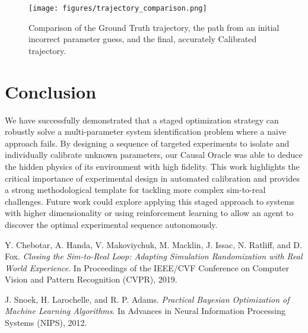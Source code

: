 \documentclass{article}
\begin{document}
\begin{figure}[h!]
\centering
\texttt{[image: figures/trajectory\_comparison.png]}
\caption{Comparison of the Ground Truth trajectory, the path from an initial incorrect parameter guess, and the final, accurately Calibrated trajectory.}
\label{fig:trajectory}
\end{figure}

\section{Conclusion}
We have successfully demonstrated that a staged optimization strategy can robustly solve a multi-parameter system identification problem where a naive approach fails. By designing a sequence of targeted experiments to isolate and individually calibrate unknown parameters, our Causal Oracle was able to deduce the hidden physics of its environment with high fidelity. This work highlights the critical importance of experimental design in automated calibration and provides a strong methodological template for tackling more complex sim-to-real challenges. Future work could explore applying this staged approach to systems with higher dimensionality or using reinforcement learning to allow an agent to discover the optimal experimental sequence autonomously.

\begin{thebibliography}{9}

Y. Chebotar, A. Handa, V. Makoviychuk, M. Macklin, J. Issac, N. Ratliff, and D. Fox.
\textit{Closing the Sim-to-Real Loop: Adapting Simulation Randomization with Real World Experience}.
In Proceedings of the IEEE/CVF Conference on Computer Vision and Pattern Recognition (CVPR), 2019.

J. Snoek, H. Larochelle, and R. P. Adams.
\textit{Practical Bayesian Optimization of Machine Learning Algorithms}.
In Advances in Neural Information Processing Systems (NIPS), 2012.

\end{thebibliography}
\end{document}
